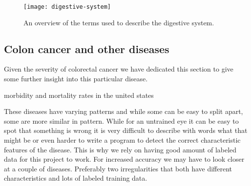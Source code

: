 \documentclass[thesis.tex]{subfiles}
\begin{document}
\begin{figure}[h] %
  \begin{center}
    \texttt{[image: digestive-system]}
    \caption[An overview of the terms used to describe the digestive system]{An overview of the terms used to describe the digestive system\footnotemark.}
    \label{fig:digestive_system}
  \end{center}
\end{figure}




\subsection{Colon cancer and other diseases} \label{sec:colon_cancer}
Given the severity of colorectal cancer we have dedicated this section to give some further insight into this particular disease. %


morbidity and mortality rates in the united states

These diseases have varying patterns and while some can be easy to split apart, some are more similar in pattern. While for an untrained eye it can be easy to spot that something is wrong it is very difficult to describe with words what that might be or even harder to write a program to detect the correct characteristic features of the disease. This is why we rely on having good amount of labeled data for this project to work. For increased accuracy we may have to look closer at a couple of diseases. Preferably two irregularities that both have different characteristics and lots of labeled training data.
\end{document}
